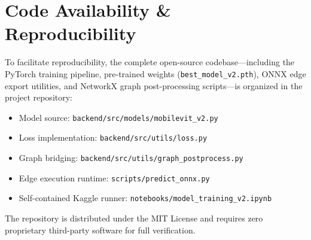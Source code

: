 \documentclass[conference]{IEEEtran}
\begin{document}
\section{Code Availability \& Reproducibility}
To facilitate reproducibility, the complete open-source codebase—including the PyTorch training pipeline, pre-trained weights (\texttt{best\_model\_v2.pth}), ONNX edge export utilities, and NetworkX graph post-processing scripts—is organized in the project repository:
\begin{itemize}
    \item Model source: \texttt{backend/src/models/mobilevit\_v2.py}
    \item Loss implementation: \texttt{backend/src/utils/loss.py}
    \item Graph bridging: \texttt{backend/src/utils/graph\_postprocess.py}
    \item Edge execution runtime: \texttt{scripts/predict\_onnx.py}
    \item Self-contained Kaggle runner: \texttt{notebooks/model\_training\_v2.ipynb}
\end{itemize}
The repository is distributed under the MIT License and requires zero proprietary third-party software for full verification.
\end{document}
